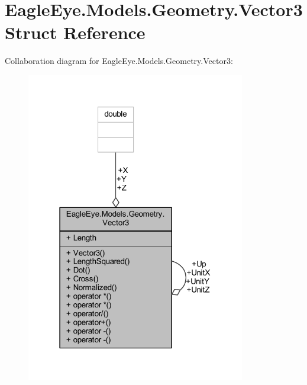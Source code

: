 \hypertarget{struct_eagle_eye_1_1_models_1_1_geometry_1_1_vector3}{}\section{Eagle\+Eye.\+Models.\+Geometry.\+Vector3 Struct Reference}
\label{struct_eagle_eye_1_1_models_1_1_geometry_1_1_vector3}


Collaboration diagram for Eagle\+Eye.\+Models.\+Geometry.\+Vector3\+:
\nopagebreak
\begin{figure}[H]
\begin{center}
\leavevmode
\includegraphics[width=271pt]{struct_eagle_eye_1_1_models_1_1_geometry_1_1_vector3__coll__graph}
\end{center}
\end{figure}
